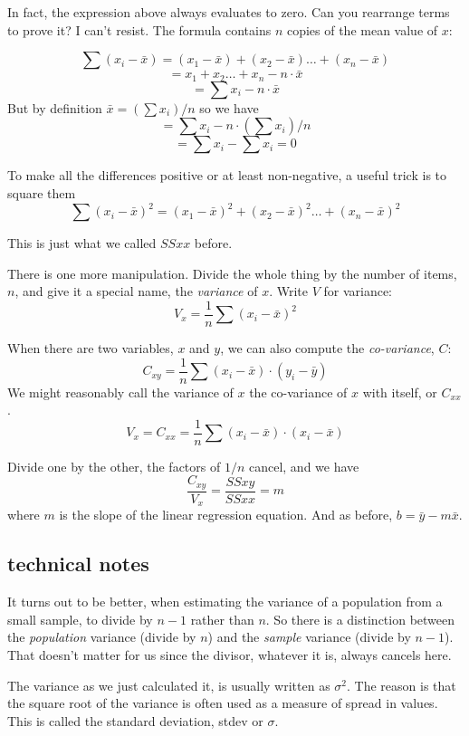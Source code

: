 \documentclass[11pt, oneside]{article}
\begin{document}
In fact, the expression above always evaluates to zero.  Can you rearrange terms to prove it?  I can't resist.  The formula contains $n$ copies of the mean value of $x$:

\[ \sum (x_i - \bar{x}) = (x_1 - \bar{x}) + (x_2 - \bar{x}) \dots + (x_n - \bar{x}) \]
\[ = x_1 + x_2 \dots + x_n - n \cdot \bar{x} \]
\[ = \sum x_i - n \cdot \bar{x} \]
But by definition $\bar{x} = (\sum x_i)/n$ so we have
\[ = \sum x_i - n \cdot (\sum x_i)/n \]
\[ = \sum x_i - \sum x_i  = 0 \]

To make all the differences positive or at least non-negative, a useful trick is to square them
\[ \sum (x_i - \bar{x})^2 = (x_1 - \bar{x})^2 + (x_2 - \bar{x})^2 \dots + (x_n - \bar{x})^2  \]

This is just what we called $SSxx$ before.

There is one more manipulation.  Divide the whole thing by the number of items, $n$, and give it a special name, the \emph{variance} of $x$.  Write $V$ for variance:
\[ V_x = \frac{1}{n} \sum (x_i - \bar{x})^2 \]

When there are two variables, $x$ and $y$, we can also compute the \emph{co-variance}, $C$:
\[ C_{xy} = \frac{1}{n} \sum (x_i - \bar{x}) \cdot (y_i - \bar{y})  \]
We might reasonably call the variance of $x$ the co-variance of $x$ with itself, or $C_{xx}$.
\[ V_x = C_{xx} = \frac{1}{n} \sum (x_i - \bar{x}) \cdot (x_i - \bar{x}) \]

Divide one by the other, the factors of $1/n$ cancel, and we have
\[ \frac{C_{xy}}{V_x} = \frac{SSxy}{SSxx} = m \]
where $m$ is the slope of the linear regression equation.  And as before, $b = \bar{y} - m \bar{x}$.

\subsection*{technical notes}
It turns out to be better, when estimating the variance of a population from a small sample, to divide by $n-1$ rather than $n$.  So there is a distinction between the \emph{population} variance (divide by $n$) and the \emph{sample} variance (divide by $n-1$).  That doesn't matter for us since the divisor, whatever it is, always cancels here.

The variance as we just calculated it, is usually written as $\sigma^2$.  The reason is that the square root of the variance is often used as a measure of spread in values.  This is called the standard deviation, stdev or $\sigma$.
\end{document}
